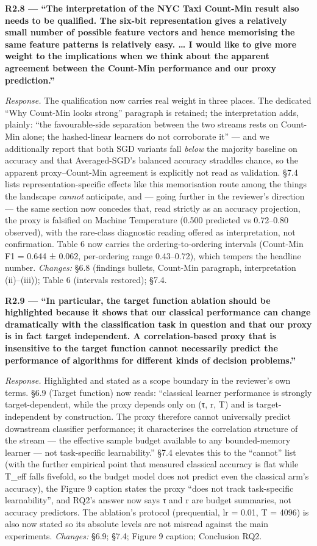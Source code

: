 \documentclass[
  11pt,
]{article}
\begin{document}
\textbf{R2.8 --- ``The interpretation of the NYC Taxi Count-Min result
also needs to be qualified. The six-bit representation gives a
relatively small number of possible feature vectors and hence memorising
the same feature patterns is relatively easy. \ldots{} I would like to
give more weight to the implications when we think about the apparent
agreement between the Count-Min performance and our proxy prediction.''}

\emph{Response.} The qualification now carries real weight in three
places. The dedicated ``Why Count-Min looks strong'' paragraph is
retained; the interpretation adds, plainly: ``the favourable-side
separation between the two streams rests on Count-Min alone; the
hashed-linear learners do not corroborate it'' --- and we additionally
report that both SGD variants fall \emph{below} the majority baseline on
accuracy and that Averaged-SGD's balanced accuracy straddles chance, so
the apparent proxy--Count-Min agreement is explicitly not read as
validation. §7.4 lists representation-specific effects like this
memorisation route among the things the landscape \emph{cannot}
anticipate, and --- going further in the reviewer's direction --- the
same section now concedes that, read strictly as an accuracy projection,
the proxy is falsified on Machine Temperature (0.500 predicted vs
0.72--0.80 observed), with the rare-class diagnostic reading offered as
interpretation, not confirmation. Table 6 now carries the
ordering-to-ordering intervals (Count-Min F1 = 0.644 ± 0.062,
per-ordering range 0.43--0.72), which tempers the headline number.
\emph{Changes:} §6.8 (findings bullets, Count-Min paragraph,
interpretation (ii)--(iii)); Table 6 (intervals restored); §7.4.

\textbf{R2.9 --- ``In particular, the target function ablation should be
highlighted because it shows that our classical performance can change
dramatically with the classification task in question and that our proxy
is in fact target independent. A correlation-based proxy that is
insensitive to the target function cannot necessarily predict the
performance of algorithms for different kinds of decision problems.''}

\emph{Response.} Highlighted and stated as a scope boundary in the
reviewer's own terms. §6.9 (Target function) now reads: ``classical
learner performance is strongly target-dependent, while the proxy
depends only on (τ, r, T) and is target-independent by construction. The
proxy therefore cannot universally predict downstream classifier
performance; it characterises the correlation structure of the stream
--- the effective sample budget available to any bounded-memory learner
--- not task-specific learnability.'' §7.4 elevates this to the
``cannot'' list (with the further empirical point that measured
classical accuracy is flat while T\_eff falls fivefold, so the budget
model does not predict even the classical arm's accuracy), the Figure 9
caption states the proxy ``does not track task-specific learnability'',
and RQ2's answer now says τ and r are budget summaries, not accuracy
predictors. The ablation's protocol (prequential, lr = 0.01, T = 4096)
is also now stated so its absolute levels are not misread against the
main experiments. \emph{Changes:} §6.9; §7.4; Figure 9 caption;
Conclusion RQ2.
\end{document}
